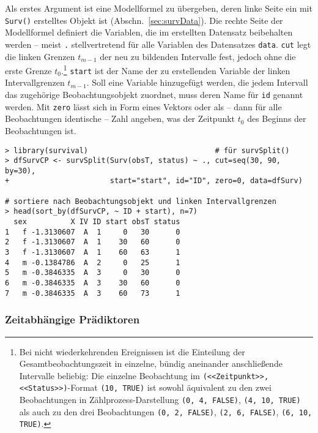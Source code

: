 Als erstes Argument ist eine Modellformel zu übergeben, deren linke Seite ein mit \lstinline!Surv()! erstelltes Objekt ist (Abschn.\ \ref{sec:survData}). Die rechte Seite der Modellformel definiert die Variablen, die im erstellten Datensatz beibehalten werden -- meist \lstinline!.! stellvertretend für alle Variablen des Datensatzes \lstinline!data!. \lstinline!cut! legt die linken Grenzen $t_{m-1}$ der neu zu bildenden Intervalle fest, jedoch ohne die erste Grenze $t_{0}$.\footnote{Bei nicht wiederkehrenden Ereignissen ist die Einteilung der Gesamtbeobachtungszeit in einzelne, bündig aneinander anschließende Intervalle beliebig: Die einzelne Beobachtung im \lstinline!(<<Zeitpunkt>>, <<Status>>)!-Format \lstinline!(10, TRUE)! ist sowohl äquivalent zu den zwei Beobachtungen in Zählprozess-Darstellung \lstinline!(0, 4, FALSE)!, \lstinline!(4, 10, TRUE)! als auch zu den drei Beobachtungen \lstinline!(0, 2, FALSE)!, \lstinline!(2, 6, FALSE)!, \lstinline!(6, 10, TRUE)!.} \lstinline!start! ist der Name der zu erstellenden Variable der linken Intervallgrenzen $t_{m-1}$. Soll eine Variable hinzugefügt werden, die jedem Intervall das zugehörige Beobachtungsobjekt zuordnet, muss deren Name für \lstinline!id! genannt werden. Mit \lstinline!zero! lässt sich in Form eines Vektors oder als -- dann für alle Beobachtungen identische -- Zahl angeben, was der Zeitpunkt $t_{0}$ des Beginns der Beobachtungen ist.
\begin{lstlisting}
> library(survival)                             # für survSplit()
> dfSurvCP <- survSplit(Surv(obsT, status) ~ ., cut=seq(30, 90, by=30),
+                       start="start", id="ID", zero=0, data=dfSurv)

# sortiere nach Beobachtungsobjekt und linken Intervallgrenzen
> head(sort_by(dfSurvCP, ~ ID + start), n=7)
  sex          X IV ID start obsT status
1   f -1.3130607  A  1     0   30      0
2   f -1.3130607  A  1    30   60      0
3   f -1.3130607  A  1    60   63      1
4   m -0.1384786  A  2     0   25      1
5   m -0.3846335  A  3     0   30      0
6   m -0.3846335  A  3    30   60      0
7   m -0.3846335  A  3    60   73      1
\end{lstlisting}

\subsubsection{Zeitabhängige Prädiktoren}

